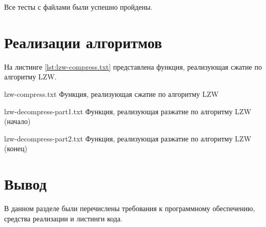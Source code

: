 
Все тесты с файлами были успешно пройдены.

\section{Реализации алгоритмов}

На листинге \ref{lst:lzw-compress.txt} представлена функция, реализующая сжатие по алгоритму LZW.


{lzw-compress.txt} %
{Функция, реализующая сжатие по алгоритму LZW} %

\clearpage

{lzw-decompress-part1.txt} %
{Функция, реализующая разжатие по алгоритму LZW (начало)} %

\clearpage 

{lzw-decompress-part2.txt} %
{Функция, реализующая разжатие по алгоритму LZW (конец)} %

\section*{Вывод}

В данном разделе были перечислены требования к программному обеспечению, средства реализации и листинги кода.

    